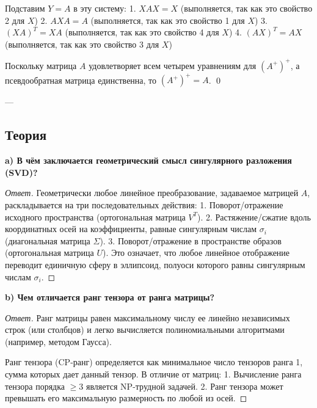 \documentclass[11pt, a4paper]{article}
\begin{document}
Подставим $Y = A$ в эту систему:
1. $X A X = X$ (выполняется, так как это свойство 2 для $X$)
2. $A X A = A$ (выполняется, так как это свойство 1 для $X$)
3. $(X A)^T = X A$ (выполняется, так как это свойство 4 для $X$)
4. $(A X)^T = A X$ (выполняется, так как это свойство 3 для $X$)

Поскольку матрица $A$ удовлетворяет всем четырем уравнениям для $(A^+)^+$, а псевдообратная матрица единственна, то $(A^+)^+ = A$. \qed

---

\subsection*{Теория}

\textbf{a) В чём заключается геометрический смысл сингулярного разложения (SVD)?}
\begin{proof}[Ответ]
Геометрически любое линейное преобразование, задаваемое матрицей $A$, раскладывается на три последовательных действия:
1. Поворот/отражение исходного пространства (ортогональная матрица $V^T$).
2. Растяжение/сжатие вдоль координатных осей на коэффициенты, равные сингулярным числам $\sigma_i$ (диагональная матрица $\Sigma$).
3. Поворот/отражение в пространстве образов (ортогональная матрица $U$).
Это означает, что любое линейное отображение переводит единичную сферу в эллипсоид, полуоси которого равны сингулярным числам $\sigma_i$.
\end{proof}

\textbf{b) Чем отличается ранг тензора от ранга матрицы?}
\begin{proof}[Ответ]
Ранг матрицы равен максимальному числу ее линейно независимых строк (или столбцов) и легко вычисляется полиномиальными алгоритмами (например, методом Гаусса). 

Ранг тензора (CP-ранг) определяется как минимальное число тензоров ранга 1, сумма которых дает данный тензор. В отличие от матриц:
1. Вычисление ранга тензора порядка $\ge 3$ является NP-трудной задачей.
2. Ранг тензора может превышать его максимальную размерность по любой из осей.
\end{proof}
\end{document}
